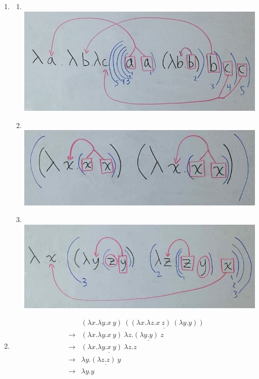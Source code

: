\documentclass[10pt]{article}
\newcommand{\steps}{\longrightarrow}
\newcommand{\apply}{\lambda x. \lambda y. x~y}
\begin{document}
\begin{enumerate}
  \item \begin{enumerate}
    \item \text{ } \\ \includegraphics[scale=0.5]{i}
    \item \text{ } \\ \includegraphics[scale=0.5]{ii}
    \item \text{ } \\ \includegraphics[scale=0.5]{iii}
  \end{enumerate}
  \item \begin{eqnarray*}
    &        & (\apply) ~ \underline{((\lambda x. \lambda z. x~z) ~ (\lambda y. y))} \\
    & \steps & (\apply) ~ \lambda z. \underline{(\lambda y.y) ~ z} \\
    & \steps & \underline{(\apply)~\lambda z. z} \\
    & \steps & \lambda y. \underline{(\lambda z. z)~y} \\
    & \steps & \lambda y. y
  \end{eqnarray*}
\end{enumerate}
\end{document}
